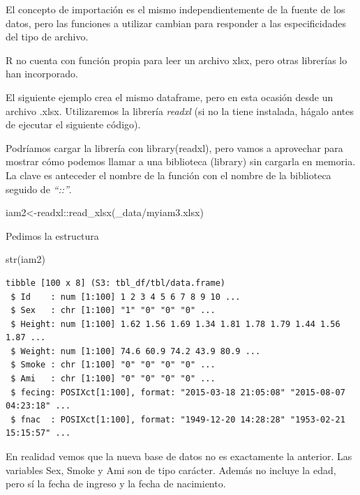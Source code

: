\documentclass[
  letterpaper,
  DIV=11,
  numbers=noendperiod]{scrreprt}
\newenvironment{Shaded}{\begin{snugshade}}{\end{snugshade}}
\newcommand{\FunctionTok}[1]{\textcolor[rgb]{0.28,0.35,0.67}{#1}}
\newcommand{\NormalTok}[1]{\textcolor[rgb]{0.00,0.23,0.31}{#1}}
\newcommand{\OtherTok}[1]{\textcolor[rgb]{0.00,0.23,0.31}{#1}}
\newcommand{\SpecialCharTok}[1]{\textcolor[rgb]{0.37,0.37,0.37}{#1}}
\newcommand{\StringTok}[1]{\textcolor[rgb]{0.13,0.47,0.30}{#1}}
\begin{document}
El concepto de importación es el mismo independientemente de la fuente
de los datos, pero las funciones a utilizar cambian para responder a las
especificidades del tipo de archivo.

R no cuenta con función propia para leer un archivo xlsx, pero otras
librerías lo han incorporado.

El siguiente ejemplo crea el mismo dataframe, pero en esta ocasión desde
un archivo .xlsx. Utilizaremos la librería \emph{readxl} (si no la tiene
instalada, hágalo antes de ejecutar el siguiente código).

Podríamos cargar la librería con library(readxl), pero vamos a
aprovechar para mostrar cómo podemos llamar a una biblioteca (library)
sin cargarla en memoria. La clave es anteceder el nombre de la función
con el nombre de la biblioteca seguido de \emph{``::''}.

\begin{Shaded}
\begin{Highlighting}[]
\NormalTok{iam2}\OtherTok{\textless{}{-}}\NormalTok{readxl}\SpecialCharTok{::}\FunctionTok{read\_xlsx}\NormalTok{(}\StringTok{\textquotesingle{}\_data/myiam3.xlsx\textquotesingle{}}\NormalTok{)}
\end{Highlighting}
\end{Shaded}

Pedimos la estructura

\begin{Shaded}
\begin{Highlighting}[]
\FunctionTok{str}\NormalTok{(iam2)}
\end{Highlighting}
\end{Shaded}

\begin{verbatim}
tibble [100 x 8] (S3: tbl_df/tbl/data.frame)
 $ Id    : num [1:100] 1 2 3 4 5 6 7 8 9 10 ...
 $ Sex   : chr [1:100] "1" "0" "0" "0" ...
 $ Height: num [1:100] 1.62 1.56 1.69 1.34 1.81 1.78 1.79 1.44 1.56 1.87 ...
 $ Weight: num [1:100] 74.6 60.9 74.2 43.9 80.9 ...
 $ Smoke : chr [1:100] "0" "0" "0" "0" ...
 $ Ami   : chr [1:100] "0" "0" "0" "0" ...
 $ fecing: POSIXct[1:100], format: "2015-03-18 21:05:08" "2015-08-07 04:23:18" ...
 $ fnac  : POSIXct[1:100], format: "1949-12-20 14:28:28" "1953-02-21 15:15:57" ...
\end{verbatim}

En realidad vemos que la nueva base de datos no es exactamente la
anterior. Las variables Sex, Smoke y Ami son de tipo carácter. Además no
incluye la edad, pero sí la fecha de ingreso y la fecha de nacimiento.
\end{document}
